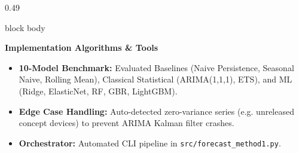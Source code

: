 \documentclass[aspectratio=169, 10pt]{beamer}
\newenvironment{card}[1][]{%
        \begin{beamercolorbox}[rounded=true,shadow=false,wd=\linewidth,sep=3.5pt,#1]{block body}%
        \fontsize{7.8pt}{9.8pt}\selectfont%
    }{%
        \end{beamercolorbox}%
    }
\begin{document}
\begin{frame}[t]
\begin{columns}[T]
            \begin{column}{0.49\textwidth}                                                                                                                                                             
                \begin{card}                                                                                                                                                                           
                    {\fontsize{8pt}{9.5pt}\selectfont \textbf{\color{BlueAccent}Implementation Algorithms \& Tools}}\\[0.06cm]                                                                         
                    \begin{itemize}\setlength{\itemsep}{2pt}                                                                                                                                           
                        \item \textbf{10-Model Benchmark:} Evaluated Baselines (Naive Persistence, Seasonal Naive, Rolling Mean), Classical Statistical (ARIMA(1,1,1), ETS), and ML (Ridge, ElasticNet,
  RF, GBR, LightGBM).                                                                                                                                                                                  
                        \item \textbf{Edge Case Handling:} Auto-detected zero-variance series (e.g. unreleased concept devices) to prevent ARIMA Kalman filter crashes.                                
                        \item \textbf{Orchestrator:} Automated CLI pipeline in \texttt{src/forecast\_method1.py}.                                                                                      
                    \end{itemize}                                                                                                                                                                      
                \end{card}                                                                                                                                                                             
            \end{column}                                                                                                                                                                               

\end{columns}
\end{frame}
\end{document}

